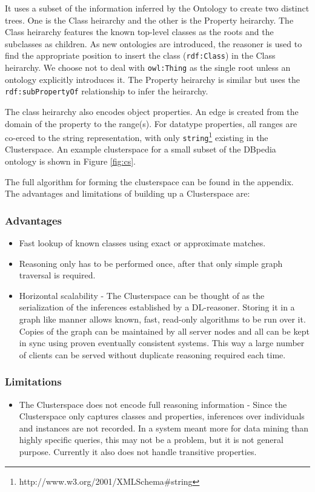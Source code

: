 \documentclass[journal]{IEEEtran}
\begin{document}
It uses a subset of the information inferred by the Ontology to create two
distinct trees. One is the Class heirarchy and the other is the Property
heirarchy. The Class heirarchy features the known top-level classes as the
roots and the subclasses as children. As new ontologies are introduced, the
reasoner is used to find the appropriate position to insert the class
(\texttt{rdf:Class}) in the Class heirarchy. We choose not to deal with
\texttt{owl:Thing} as the single root unless an ontology explicitly introduces
it. The Property heirarchy is similar but uses the \texttt{rdf:subPropertyOf}
relationship to infer the heirarchy.

The class heirarchy also encodes object properties. An edge is created from the
domain of the property to the range(s). For datatype properties, all ranges are
co-erced to the string representation, with only
\texttt{string}\footnote{http://www.w3.org/2001/XMLSchema\#string} existing in
the Clusterspace. An example clusterspace for a small subset of the DBpedia
ontology is shown in Figure \ref{fig:cs}.

The full algorithm for forming the clusterspace can be found in the appendix. %
The advantages and limitations of building up a Clusterspace are:

\subsubsection*{Advantages}
\begin{itemize}
    \item Fast lookup of known classes using exact or approximate matches.
    \item Reasoning only has to be performed once, after that only simple graph
        traversal is required.
    \item Horizontal scalability - The Clusterspace can be thought of as the
        serialization of the inferences established by a DL-reasoner. Storing
        it in a graph like manner allows known, fast, read-only algorithms to
        be run over it. Copies of the graph can be maintained by all server
        nodes and all can be kept in sync using proven eventually consistent
        systems\cite{Vogels08consistent}. This way a large number of clients
        can be served without duplicate reasoning required each time.
\end{itemize}

\subsubsection*{Limitations}
\begin{itemize}
    \item The Clusterspace does not encode full reasoning information - Since
        the Clusterspace only captures classes and properties, inferences over
        individuals and instances are not recorded. In a system meant more for
        data mining than highly specific queries, this may not be a problem,
        but it is not general purpose. Currently it also does not handle
        transitive properties.
\end{itemize}
\end{document}
